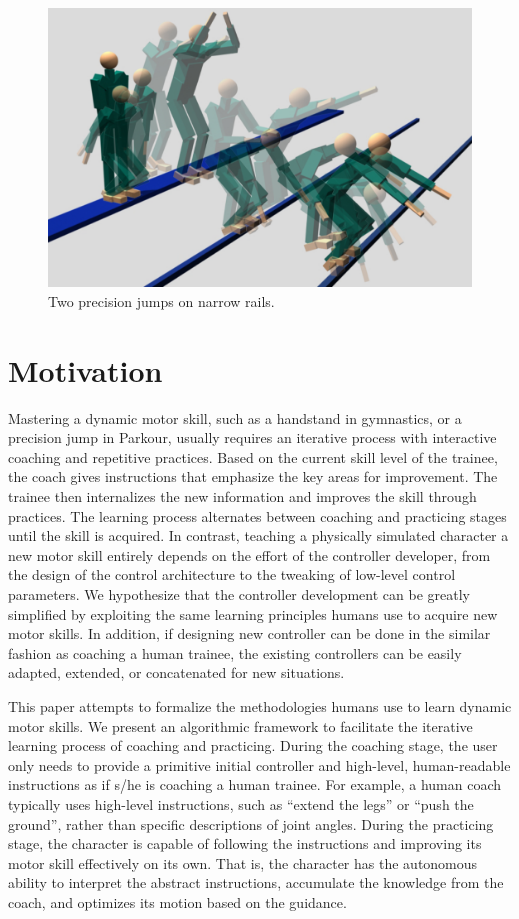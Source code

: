 \begin{figure}[tb]
\center
  \includegraphics[width=0.7\linewidth]{images/teaser}
  \caption{
  Two precision jumps on narrow rails.
  }
  \label{fig:parkour_teaser}
\end{figure}

\quad
\section{Motivation}

Mastering a dynamic motor skill, such as a handstand in gymnastics, or
a precision jump in Parkour,
usually requires an iterative process
with interactive coaching and repetitive practices. Based on the
current skill level of the trainee, the coach gives instructions that
emphasize the key areas for improvement. The trainee then internalizes
the new information and improves the skill through practices. The
learning process alternates between coaching and practicing stages
until the skill is acquired. In contrast, teaching a physically
simulated character a new motor skill entirely depends on the effort
of the controller developer, from the design of the control
architecture to the tweaking of low-level control parameters. We
hypothesize that the controller development can be greatly simplified
by exploiting the same learning principles humans use to acquire new
motor skills. In addition, if designing new controller can be done in
the similar fashion as coaching a human trainee, the existing
controllers can be easily adapted, extended, or concatenated for new
situations.

This paper attempts to formalize the methodologies humans use to learn
dynamic motor skills. We present an algorithmic framework to
facilitate the iterative learning process of coaching and
practicing. During the coaching stage, the user only needs to provide
a primitive initial controller and
high-level, human-readable instructions as if s/he is coaching a human
trainee. For example, a human coach typically uses high-level
instructions, such as ``extend the legs'' or ``push the ground'', rather
than specific descriptions of joint angles. During the practicing
stage, the character is capable of following the instructions and
improving its motor skill effectively on its own. That is, the
character has the autonomous ability to interpret the abstract
instructions, accumulate the knowledge from the coach, and optimizes
its motion based on the guidance.

